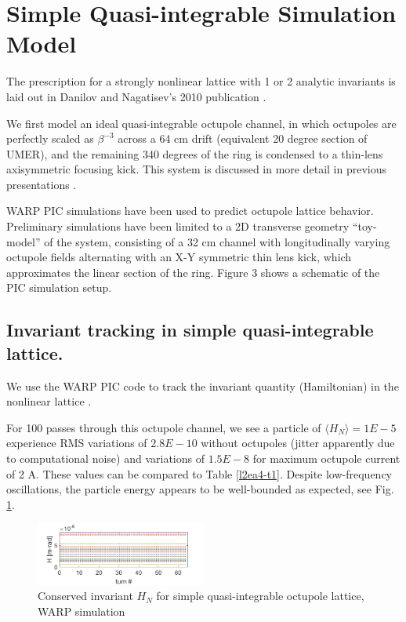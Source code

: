\section{Simple Quasi-integrable Simulation Model}

The prescription for a strongly nonlinear lattice with 1 or 2 analytic invariants is laid out in Danilov and Nagatisev's 2010 publication \cite{Danilov2010}.

We first model an ideal quasi-integrable octupole channel, in which octupoles are perfectly scaled as $\beta^{-3}$ across a 64 cm drift (equivalent 20 degree section of UMER), and the remaining 340 degrees of the ring is condensed to a thin-lens axisymmetric focusing kick. This system is discussed in more detail in previous presentations \cite{KRAAC}.

WARP PIC simulations have been used to predict octupole lattice behavior. Preliminary simulations have been limited to a 2D transverse geometry “toy-model” of the system, consisting of a 32 cm channel with longitudinally varying octupole fields alternating with an X-Y symmetric thin lens kick, which approximates the linear section of the ring. Figure 3 shows a schematic of the PIC simulation setup.

\subsection{Invariant tracking in simple quasi-integrable lattice.}

We use the WARP PIC code to track the invariant quantity (Hamiltonian) in the nonlinear lattice \cite{warp}. 

For 100 passes through this octupole channel, we see a particle of $\langle H_N\rangle =1E-5$ experience RMS variations of $2.8E-10$ without octupoles (jitter apparently due to computational noise) and variations of $1.5E-8$ for maximum octupole current of 2 A. These values can be compared to Table \ref{l2ea4-t1}. Despite low-frequency oscillations, the particle energy appears to be well-bounded as expected, see Fig. \ref{toyinvar}.

\begin{figure}[]
   \centering
    \includegraphics[width=0.5\textwidth]{7.figures/HvsZ_crun1_toylattice.png}
 	\caption{Conserved invariant $H_N$ for simple quasi-integrable octupole lattice, WARP simulation}
   \label{toyinvar}
\end{figure}



